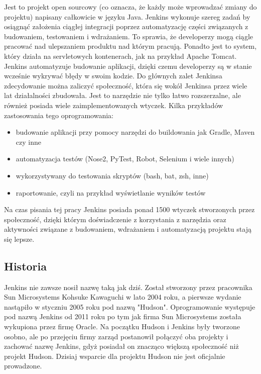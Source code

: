 Jest to projekt open sourcowy (co oznacza, że każdy może wprowadzać zmiany do projektu) napisany całkowicie w języku Java. Jenkins wykonuje szereg zadań by osiągnąć założenia ciągłej integracji poprzez automatyzację części związanych z budowaniem, testowaniem i wdrażaniem. To sprawia, że developerzy mogą ciągle pracować nad ulepszaniem produktu nad którym pracują. Ponadto jest to system, który działa na servletowych kontenerach, jak na przykład Apache Tomcat. 
Jenkins automatyzuje budowanie aplikacji, dzięki czemu developerzy są w stanie wcześnie wykrywać błędy w swoim kodzie. Do głównych zalet Jenkinsa zdecydowanie można zaliczyć społeczność, która się wokół Jenkinsa przez wiele lat działalności zbudowała. Jest to narzędzie nie tylko łatwo rozszerzalne, ale również posiada wiele zaimplementowanych wtyczek. 
Kilka przykładów zastosowania tego oprogramowania:
\begin{itemize}
    \item budowanie aplikacji przy pomocy narzędzi do buildowania jak Gradle, Maven czy inne 
    \item automatyzacja testów  (Nose2, PyTest, Robot, Selenium i wiele innych)
    \item wykorzystywany do testowania skryptów (bash, bat, zsh, inne)
    \item raportowanie, czyli na przykład wyświetlanie wyników testów
\end{itemize}

Na czas pisania tej pracy Jenkins posiada ponad 1500 wtyczek stworzonych przez społeczność, dzięki którym doświadczenie z korzystania z narzędzia oraz aktywności związane z budowaniem, wdrażaniem i automatyzacją projektu stają się lepsze. 

\subsection{Historia}

Jenkins nie zawsze nosił nazwę taką jak dziś. Został stworzony przez pracownika Sun Microsystems Kohsuke Kawaguchi w lato 2004 roku, a pierwsze wydanie nastąpiło w styczniu 2005 roku pod nazwą "Hudson". Oprogramowanie występuje pod nazwą Jenkins od 2011 roku po tym jak firma Sun Microsystems została wykupiona przez firmę Oracle. Na początku Hudson i Jenkins były tworzone osobno, ale po przejęciu firmy zarząd postanowił połączyć oba projekty i zachować nazwę Jenkins, gdyż posiadał on znacząco większą społeczność niż projekt Hudson. Dzisiaj wsparcie dla projektu Hudson nie jest oficjalnie prowadzone. 


